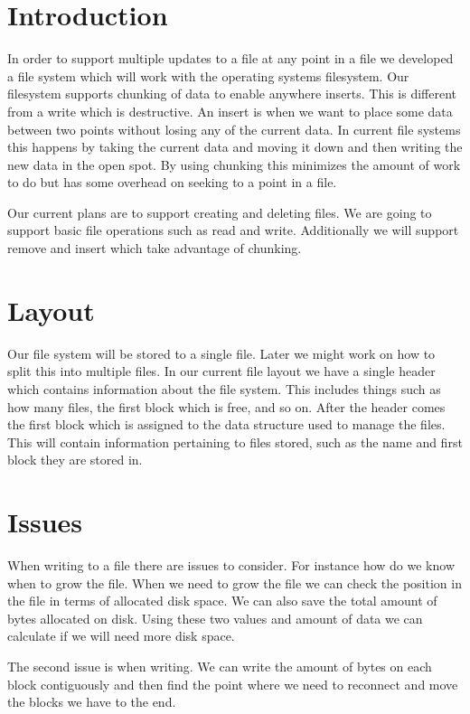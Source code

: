 \documentclass{article}
\begin{document}
\section*{Introduction}

In order to support multiple updates to a file at any point in a file we
developed a file system which will work with the operating systems filesystem.
Our filesystem supports chunking of data to enable anywhere inserts.
This is different from a write which is destructive.
An insert is when we want to place some data between two points without losing any of the current data.
In current file systems this happens by taking the current data and moving it down and then writing the new data in the open spot.
By using chunking this minimizes the amount of work to do but has some overhead on seeking to a point in a file.

Our current plans are to support creating and deleting files.
We are going to support basic file operations such as read and write.
Additionally we will support remove and insert which take advantage of chunking.


\section*{Layout}

Our file system will be stored to a single file.
Later we might work on how to split this into multiple files.
In our current file layout we have a single header which contains information about the file system.
This includes things such as how many files, the first block which is free, and so on.
After the header comes the first block which is assigned to the data structure used to manage the files.
This will contain information pertaining to files stored, such as the name and first block they are stored in.

\section*{Issues}

When writing to a file there are issues to consider.
For instance how do we know when to grow the file.
When we need to grow the file we can check the position in the file in terms of allocated disk space.
We can also save the total amount of bytes allocated on disk.
Using these two values and amount of data we can calculate if we will need more disk space.

The second issue is when writing.  We can write the amount of bytes on each block contiguously and then
find the point where we need to reconnect and move the blocks we have to the end.
\end{document}
